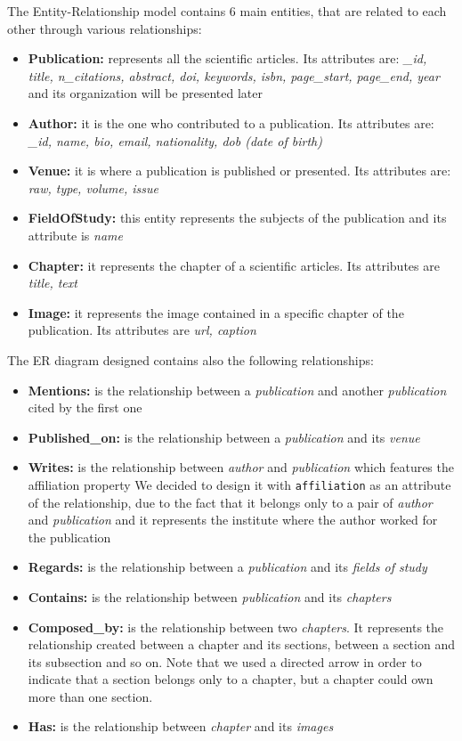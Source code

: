 \documentclass{Configuration_Files/PoliMi3i_thesis}
\begin{document}
The Entity-Relationship model contains 6 main entities, that are related to each other through various relationships:
\begin{itemize}
	\item \textbf{Publication:} represents all the scientific articles. Its attributes are: \emph{\_id, title, n\_citations,
		abstract, doi, keywords, isbn, page\_start, page\_end, year} and its organization will be presented later
	\item \textbf{Author:} it is the one who contributed to a publication. Its attributes are: \emph{\_id, name, bio,
		email, nationality, dob (date of birth)}
	\item \textbf{Venue:} it is where a publication is published or presented. Its attributes are: \emph{raw, type,
		volume, issue}
	\item \textbf{FieldOfStudy:} this entity represents the subjects of the publication and its attribute is \emph{name}
	\item \textbf{Chapter:} it represents the chapter of a scientific articles. Its attributes are \emph{title, text}
	\item \textbf{Image:} it represents the image contained in a specific chapter of the publication. Its attributes are
		\emph{url, caption}
\end{itemize}

The ER diagram designed contains also the following relationships:
\begin{itemize}
	\item \textbf{Mentions:} is the relationship between a \emph{publication} and another \emph{publication} cited by the first one
	\item \textbf{Published\_on:} is the relationship between a \emph{publication} and its \emph{venue}
	\item \textbf{Writes:} is the relationship between \emph{author} and \emph{publication} which features the affiliation property
		We decided to design it with \verb |affiliation| as an attribute of the relationship, due to the fact that it belongs
		only to a pair of \emph{author} and \emph{publication} and it represents the institute where the author worked for the publication
	\item \textbf{Regards:} is the relationship between a \emph{publication} and its \emph{fields of study}
	\item \textbf{Contains:} is the relationship between \emph{publication} and its \emph{chapters} 
	\item \textbf{Composed\_by:} is the relationship between two \emph{chapters}. It represents the relationship created
		between a chapter and its sections, between a section and its subsection and so on. Note that we used a directed
		arrow in order to indicate that a section belongs only to a chapter, but a chapter could own more than one section.
	\item \textbf{Has:} is the relationship between \emph{chapter} and its \emph{images}
\end{itemize}
\end{document}

